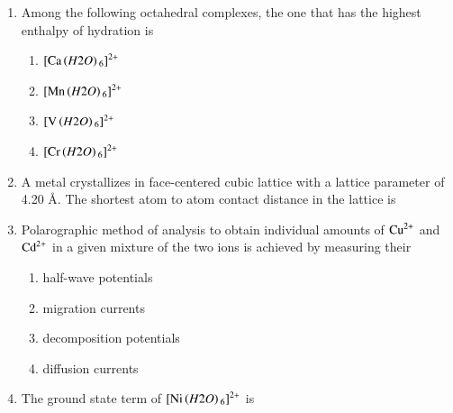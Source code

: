 \documentclass[journal,12pt,onecolumn]{IEEEtran}
\theoremstyle{remark}
\begin{document}
\begin{enumerate}
    
\item Among the following octahedral complexes, the one that has the highest enthalpy of hydration is
    \begin{enumerate}
        \item $\ce{[Ca\brak{H2O}6]^2+}$
        \item $\ce{[Mn\brak{H2O}6]^2+}$
        \item $\ce{[V\brak{H2O}6]^2+}$
        \item $\ce{[Cr\brak{H2O}6]^2+}$
    \end{enumerate}
    \hfill{}
    


\item A metal crystallizes in face-centered cubic lattice with a lattice parameter of 4.20 \AA. The shortest atom to atom contact distance in the lattice is
    \begin{enumerate}
        \hfill{}
    \end{enumerate}
    


\item Polarographic method of analysis to obtain individual amounts of $\ce{Cu^2+}$ and $\ce{Cd^2+}$ in a given mixture of the two ions  is achieved by measuring their
    \begin{enumerate}
        \item half-wave potentials
        \item migration currents
        \item decomposition potentials
        \item diffusion currents
    \end{enumerate}
    \hfill{}
    


\item The ground state term of $\ce{[Ni\brak{H2O}6]^2+}$ is
    \begin{enumerate}
        \hfill{}
    \end{enumerate}
\end{enumerate}
\end{document}
